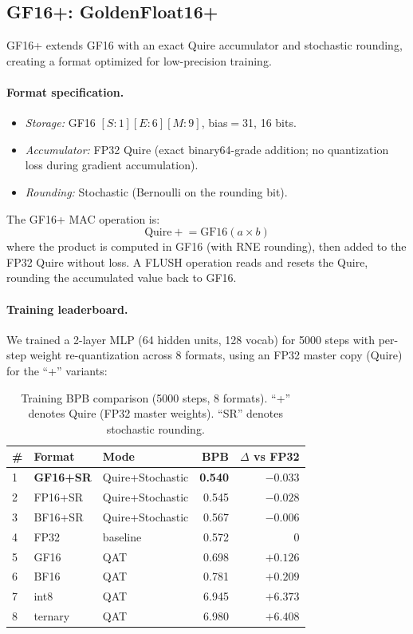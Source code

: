 \documentclass[11pt]{article}
\begin{document}
\subsection{GF16+: GoldenFloat16+}\label{sec:gf16plus}

GF16+ extends GF16 with an exact Quire accumulator and stochastic
rounding, creating a format optimized for low-precision training.

\paragraph{Format specification.}
\begin{itemize}
\item \emph{Storage:} GF16 $[S{:}1][E{:}6][M{:}9]$, bias$=$31, 16 bits.
\item \emph{Accumulator:} FP32 Quire (exact binary64-grade addition;
  no quantization loss during gradient accumulation).
\item \emph{Rounding:} Stochastic (Bernoulli on the rounding bit).
\end{itemize}

The GF16+ MAC operation is:
\begin{equation}
\text{Quire} \mathrel{+}= \text{GF16}(a \times b)
\end{equation}
where the product is computed in GF16 (with RNE rounding), then added
to the FP32 Quire without loss. A FLUSH operation reads and resets the
Quire, rounding the accumulated value back to GF16.

\paragraph{Training leaderboard.}
We trained a 2-layer MLP (64 hidden units, 128 vocab) for 5000 steps
with per-step weight re-quantization across 8 formats, using an FP32
master copy (Quire) for the ``+'' variants:

\begin{table}[h]
\centering
\footnotesize
\caption{Training BPB comparison (5000 steps, 8 formats). ``+'' denotes
Quire (FP32 master weights). ``SR'' denotes stochastic rounding.}
\label{tab:training}
\begin{tabular}{lllrr}
\toprule
\# & Format & Mode & BPB & $\Delta$ vs FP32 \\
\midrule
1 & \textbf{GF16+SR} & Quire+Stochastic & \textbf{0.540} & $-0.033$ \\
2 & FP16+SR & Quire+Stochastic & 0.545 & $-0.028$ \\
3 & BF16+SR & Quire+Stochastic & 0.567 & $-0.006$ \\
4 & FP32 & baseline & 0.572 & 0 \\
5 & GF16 & QAT & 0.698 & $+0.126$ \\
6 & BF16 & QAT & 0.781 & $+0.209$ \\
7 & int8 & QAT & 6.945 & $+6.373$ \\
8 & ternary & QAT & 6.980 & $+6.408$ \\
\bottomrule
\end{tabular}
\end{table}
\end{document}
